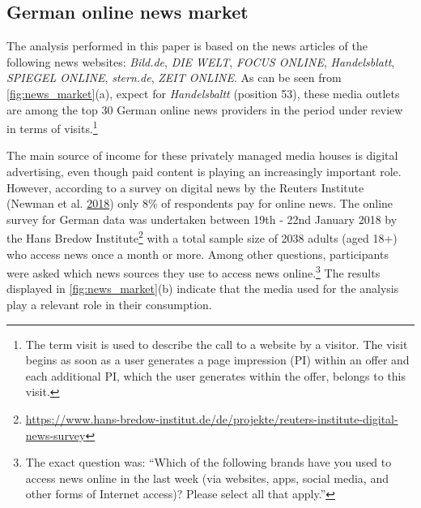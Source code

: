 \documentclass[
]{article}
\begin{document}
\hypertarget{german-online-news-market}{%
\subsection{German online news market}\label{german-online-news-market}}

The analysis performed in this paper is based on the news articles of
the following news websites: \emph{Bild.de}, \emph{DIE WELT},
\emph{FOCUS ONLINE}, \emph{Handelsblatt}, \emph{SPIEGEL ONLINE},
\emph{stern.de}, \emph{ZEIT ONLINE}. As can be seen from
\autoref{fig:news_market}(a), expect for \emph{Handelsbaltt} (position
53), these media outlets are among the top 30 German online news
providers in the period under review in terms of visits.\footnote{The
  term visit is used to describe the call to a website by a visitor. The
  visit begins as soon as a user generates a page impression (PI) within
  an offer and each additional PI, which the user generates within the
  offer, belongs to this visit.}

The main source of income for these privately managed media houses is
digital advertising, even though paid content is playing an increasingly
important role. However, according to a survey on digital news by the
Reuters Institute (Newman et al.
\protect\hyperlink{ref-newman_reuters_2018}{2018}) only 8\% of
respondents pay for online news. The online survey for German data was
undertaken between 19th - 22nd January 2018 by the Hans Bredow
Institute\footnote{\url{https://www.hans-bredow-institut.de/de/projekte/reuters-institute-digital-news-survey}}
with a total sample size of 2038 adults (aged 18+) who access news once
a month or more. Among other questions, participants were asked which
news sources they use to access news online.\footnote{The exact question
  was: ``Which of the following brands have you used to access news
  online in the last week (via websites, apps, social media, and other
  forms of Internet access)? Please select all that apply.''} The
results displayed in \autoref{fig:news_market}(b) indicate that the
media used for the analysis play a relevant role in their consumption.
\end{document}
